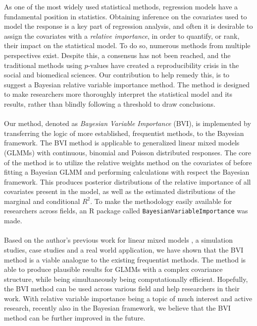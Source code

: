 As one of the most widely used statistical methods, regression models have a fundamental position in statistics. Obtaining inference on the covariates used to model the response is a key part of regression analysis, and often it is desirable to assign the covariates with a \textit{relative importance}, in order to quantify, or rank, their impact on the statistical model. To do so, numerous methods from multiple perspectives exist. Despite this, a consensus has not been reached, and the traditional methods using $p$-values have created a reproducibility crisis in the social and biomedical sciences. Our contribution to help remedy this, is to suggest a Bayesian relative variable importance method. The method is designed to make researchers more thoroughly interpret the statistical model and its results, rather than blindly following a threshold to draw conclusions.
\\
\\
Our method, denoted as \textit{Bayesian Variable Importance} (BVI), is implemented by transferring the logic of more established, frequentist methods, to the Bayesian framework. The BVI method is applicable to generalized linear mixed models (GLMMs) with continuous, binomial and Poisson distributed responses. The core of the method is to utilize the relative weights method on the covariates of before fitting a Bayesian GLMM and performing calculations with respect the Bayesian framework. This produces posterior distributions of the relative importance of all covariates present in the model, as well as the estimated distributions of the marginal and conditional $R^2$. To make the methodology easily available for researchers across fields, an R package called \texttt{BayesianVariableImportance} was made.
\\
\\
Based on the author's previous work for linear mixed models \citep{Arnstad:Relative_variable_importance_in_Bayesian_linear_mixed_models:2024}, a simulation studies, case studies and a real world application, we have shown that the BVI method is a viable analogue to the existing frequentist methods. The method is able to produce plausible results for GLMMs with a complex covariance structure, while being simultaneously being computationally efficient. Hopefully, the BVI method can be used across various field and help researchers in their work. With relative variable importance being a topic of much interest and active research, recently also in the Bayesian framework, we believe that the BVI method can be further improved in the future.